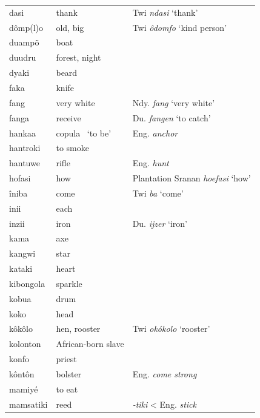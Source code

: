 \begin{longtable}[c]{ p{} p{} p{} }
    dasi            & thank         & Twi \textit{ndasi} `thank'  \\
    dômp(l)o        & old, big      & Twi \textit{ôdomfo} `kind person'  \\
    duampõ          & boat          &  \\
    duudru          & forest, night &  \\
    dyaki           & beard         &  \\
    faka            & knife         &  \\
    fang            & very white    & Ndy. \textit{fang} `very white'  \\
    fanga           & receive       & Du. \textit{fangen} `to catch'  \\
    hankaa          & copula ~`to be'%
                                    & Eng. \textit{anchor}  \\
    hantroki        & to smoke      &  \\
    hantuwe         & rifle         & Eng. \textit{hunt}  \\
    hofasi          & how           & Plantation Sranan \textit{hoefasi} `how'  \\
    îniba           & come          & Twi \textit{ba} `come'  \\
    inii            & each          &  \\
    inzii           & iron          & Du. \textit{ijzer} `iron'  \\
    kama            & axe           &  \\
    kangwi          & star          &  \\
    kataki          & heart         &  \\
    kibongola       & sparkle       &  \\
    kobua           & drum          &  \\
    koko            & head          &  \\
    kôkôlo          & hen, rooster  & Twi \textit{okókolo} `rooster'  \\
    kolonton        & African-born slave%
                                    &  \\
    konfo           & priest        &  \\
    kôntôn          & bolster       & Eng. \textit{come strong}  \\
    mamiyé          & to eat        &  \\
    mamsatiki       & reed          & \textit{-tiki} < Eng. \textit{stick}  \\

\end{longtable}
